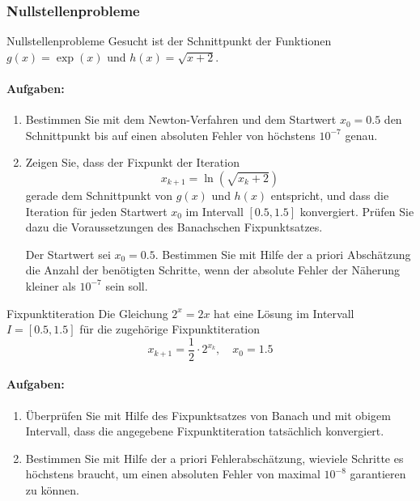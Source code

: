 \subsubsection{Nullstellenprobleme}

\begin{example2}{Nullstellenprobleme}
Gesucht ist der Schnittpunkt der Funktionen $g(x) = \exp(x)$ und $h(x) = \sqrt{x+2}$.

\paragraph{Aufgaben:}
\begin{enumerate}
    \item Bestimmen Sie mit dem Newton-Verfahren und dem Startwert $x_0 = 0.5$ den Schnittpunkt bis auf einen absoluten Fehler von höchstens $10^{-7}$ genau.
    
    \item Zeigen Sie, dass der Fixpunkt der Iteration
    $$x_{k+1} = \ln(\sqrt{x_k + 2})$$
    gerade dem Schnittpunkt von $g(x)$ und $h(x)$ entspricht, und dass die Iteration für jeden Startwert $x_0$ im Intervall $[0.5, 1.5]$ konvergiert. Prüfen Sie dazu die Voraussetzungen des Banachschen Fixpunktsatzes.
    
    Der Startwert sei $x_0 = 0.5$. Bestimmen Sie mit Hilfe der a priori Abschätzung die Anzahl der benötigten Schritte, wenn der absolute Fehler der Näherung kleiner als $10^{-7}$ sein soll.
\end{enumerate}
\end{example2}

\begin{example2}{Fixpunktiteration}
Die Gleichung $2^x = 2x$ hat eine Lösung im Intervall $I = [0.5, 1.5]$ für die zugehörige Fixpunktiteration
$$x_{k+1} = \frac{1}{2} \cdot 2^{x_k}, \quad x_0 = 1.5$$

\paragraph{Aufgaben:}
\begin{enumerate}
    \item Überprüfen Sie mit Hilfe des Fixpunktsatzes von Banach und mit obigem Intervall, dass die angegebene Fixpunktiteration tatsächlich konvergiert.
    
    \item Bestimmen Sie mit Hilfe der a priori Fehlerabschätzung, wieviele Schritte es höchstens braucht, um einen absoluten Fehler von maximal $10^{-8}$ garantieren zu können.
\end{enumerate}
\end{example2}

